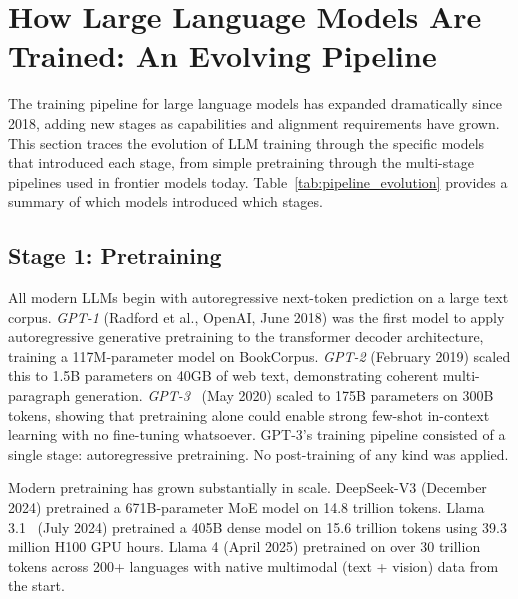 \documentclass[12pt]{article}
\begin{document}
\section{How Large Language Models Are Trained: An Evolving Pipeline}

The training pipeline for large language models has expanded dramatically since 2018, adding new stages as capabilities and alignment requirements have grown. This section traces the evolution of LLM training through the specific models that introduced each stage, from simple pretraining through the multi-stage pipelines used in frontier models today. Table~\ref{tab:pipeline_evolution} provides a summary of which models introduced which stages.

\subsection{Stage 1: Pretraining}

All modern LLMs begin with autoregressive next-token prediction on a large text corpus. \textit{GPT-1} (Radford et al., OpenAI, June 2018) was the first model to apply autoregressive generative pretraining to the transformer decoder architecture, training a 117M-parameter model on BookCorpus. \textit{GPT-2} (February 2019) scaled this to 1.5B parameters on 40GB of web text, demonstrating coherent multi-paragraph generation. \textit{GPT-3}~\cite{Brown2020GPT3} (May 2020) scaled to 175B parameters on 300B tokens, showing that pretraining alone could enable strong few-shot in-context learning with no fine-tuning whatsoever. GPT-3's training pipeline consisted of a single stage: autoregressive pretraining. No post-training of any kind was applied.

Modern pretraining has grown substantially in scale. DeepSeek-V3 (December 2024) pretrained a 671B-parameter MoE model on 14.8 trillion tokens. Llama 3.1~\cite{Touvron2023Llama2} (July 2024) pretrained a 405B dense model on 15.6 trillion tokens using 39.3 million H100 GPU hours. Llama 4 (April 2025) pretrained on over 30 trillion tokens across 200+ languages with native multimodal (text + vision) data from the start.
\end{document}
